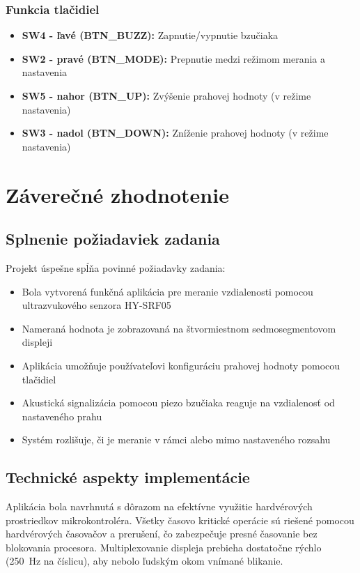 \documentclass[11pt, a4paper,slovak]{article}
\begin{document}
\subsubsection{Funkcia tlačidiel}

\begin{itemize}
    \item \textbf{SW4 - ľavé (BTN\_BUZZ):} Zapnutie/vypnutie bzučiaka
    \item \textbf{SW2 - pravé (BTN\_MODE):} Prepnutie medzi režimom merania a nastavenia
    \item \textbf{SW5 - nahor (BTN\_UP):} Zvýšenie prahovej hodnoty (v režime nastavenia)
    \item \textbf{SW3 - nadol (BTN\_DOWN):} Zníženie prahovej hodnoty (v režime nastavenia)
\end{itemize}

\newpage
\section{Záverečné zhodnotenie}

\subsection{Splnenie požiadaviek zadania}

Projekt úspešne spĺňa povinné požiadavky zadania:
\begin{itemize}
    \item Bola vytvorená funkčná aplikácia pre meranie vzdialenosti pomocou ultrazvukového senzora HY-SRF05
    \item Nameraná hodnota je zobrazovaná na štvormiestnom sedmosegmentovom displeji
    \item Aplikácia umožňuje používateľovi konfiguráciu prahovej hodnoty pomocou tlačidiel
    \item Akustická signalizácia pomocou piezo bzučiaka reaguje na vzdialenosť od nastaveného prahu
    \item Systém rozlišuje, či je meranie v rámci alebo mimo nastaveného rozsahu
\end{itemize}

\subsection{Technické aspekty implementácie}

Aplikácia bola navrhnutá s dôrazom na efektívne využitie hardvérových prostriedkov mikrokontroléra. Všetky časovo kritické operácie sú riešené pomocou hardvérových časovačov a prerušení, čo zabezpečuje presné časovanie bez blokovania procesora. Multiplexovanie displeja prebieha dostatočne rýchlo (250~Hz na číslicu), aby nebolo ľudským okom vnímané blikanie.
\end{document}
